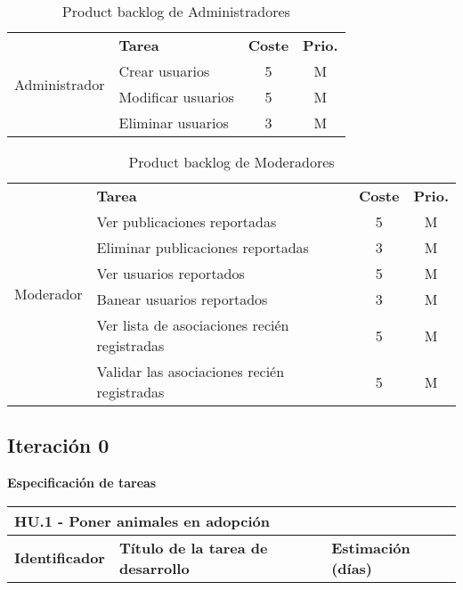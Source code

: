 \begin{table}[H]
    \centering
    \begin{tabular}{|c|p{8cm}|c|c|} \hline 
         \multirow[c]{4}{*}{Administrador}&  \textbf{Tarea}&  \textbf{Coste}& \textbf{Prio.}\\  \cline{2-4}
         &  Crear usuarios &  5& M\\ \cline{2-4}
         &  Modificar usuarios &  5& M\\ \cline{2-4}
         &  Eliminar usuarios &  3& M\\ \hline

         
         
    \end{tabular}
    \caption{Product backlog de Administradores}
    \label{tab:pb_administradores}
\end{table}

\begin{table}[H]
    \centering
    \begin{tabular}{|c|p{8cm}|c|c|} \hline 
         \multirow[c]{7}{*}{Moderador}&  \textbf{Tarea}&  \textbf{Coste}& \textbf{Prio.}\\  \cline{2-4}
         &  Ver publicaciones reportadas &  5& M\\ \cline{2-4}
         &  Eliminar publicaciones reportadas &  3& M\\ \cline{2-4}

         &  Ver usuarios reportados &  5& M\\ \cline{2-4}
         &  Banear usuarios reportados &  3& M\\ \cline{2-4}
         
         &  Ver lista de asociaciones recién registradas &  5& M\\ \cline{2-4}
         &  Validar las asociaciones recién registradas& 5 & M\\ \hline

         
         
    \end{tabular}
    \caption{Product backlog de Moderadores}
    \label{tab:pb_moderadores}
\end{table}

\subsection{Iteración 0}

\large{\textbf{Especificación de tareas}}

\begin{tabular}{|l|l|l|}
	\hline
	\multicolumn{3}{|l|}{HU.1 - Poner animales en adopción} \\
	\hline
	\textbf{Identificador} & \textbf{Título de la tarea de desarrollo} & \textbf{Estimación (días)} \\
	\hline
\end{tabular}